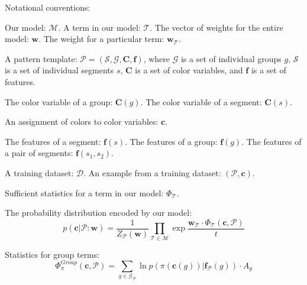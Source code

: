 
\newcommand{\pattern}{\mathcal{P}}
\newcommand{\group}{g}
\newcommand{\groups}{\mathcal{G}}
\newcommand{\segment}{s}
\newcommand{\segments}{\mathcal{S}}
\newcommand{\model}{\mathcal{M}}
\newcommand{\term}{\mathcal{T}}
\newcommand{\weights}{\mathbf{w}}
\newcommand{\dataset}{\mathcal{D}}
\newcommand{\variable}[1]{\mathbf{#1}}
\newcommand{\colorVars}{\variable{C}}
\newcommand{\colors}{\variable{c}}
\newcommand{\features}{\variable{f}}
\newcommand{\termStats}{\Phi_\term}
\newcommand{\expectation}{\mathds{E}}

\newcommand{\prop}{\pi}
\newcommand{\groupTerm}{\Phi^{Group}_\pi}
\newcommand{\segTerm}{\Phi^{Seg}_\pi}
\newcommand{\adjTerm}{\Phi^{Adj}_\pi}
\newcommand{\neighbors}{n}
\newcommand{\adj}{\text{adj}}
\newcommand{\adjStrength}{\text{str}}
\newcommand{\size}{A}

Notational conventions:

Our model: $\model$. A term in our model: $\term$. The vector of weights for the entire model: $\weights$. The weight for a particular term: $\weights_\term$.

A pattern template: $\pattern = (\segments, \groups, \colorVars, \features)$, where $\groups$ is a set of individual groups $\group$, $\segments$ is a set of individual segments $\segment$, $\colorVars$ is a set of color variables, and $\features$ is a set of features.

The color variable of a group: $\colorVars(\group)$. The color variable of a segment: $\colorVars(\segment)$.

An assignment of colors to color variables: $\colors$.

The features of a segment: $\features(\segment)$. The features of a group: $\features(\group)$. The features of a pair of segments: $\features(\segment_1, \segment_2)$.

A training dataset: $\dataset$. An example from a training dataset: $(\pattern, \colors)$.

Sufficient statistics for a term in our model: $\termStats$.

The probability distribution encoded by our model:
\begin{equation*}
p(\colors | \pattern : \weights) = \frac{1}{Z_\pattern(\weights)} \prod_{\term \in \model} \exp{\frac{ \weights_\term \cdot \termStats(\colors, \pattern)}{t}}
\end{equation*}

Statistics for group terms:
\begin{equation*}
\groupTerm(\colors, \pattern) = \sum_{\group \in \groups_\pattern} \ln p( \prop( \colors(\group) ) | \features_\pattern(\group)) \cdot \size_\group
\end{equation*}

